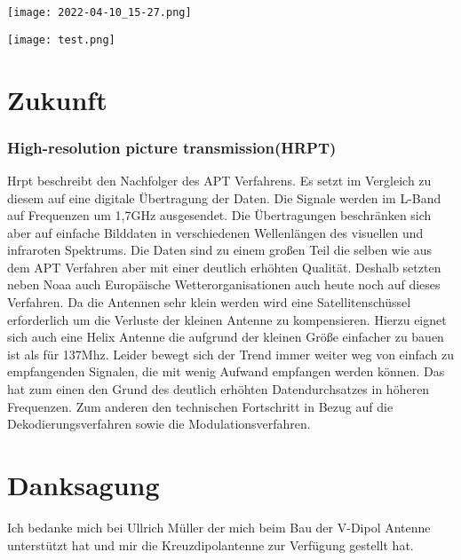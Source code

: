 \begin{center}
    \centering
    \texttt{[image: 2022-04-10\_15-27.png]}
\end{center}

\begin{center}
    \centering
    \texttt{[image: test.png]}
\end{center}



\part{Zukunft}
\section[]{High-resolution picture transmission(HRPT)}

Hrpt beschreibt den Nachfolger des APT Verfahrens. Es setzt im Vergleich zu diesem auf eine digitale Übertragung der Daten. Die Signale werden im L-Band auf Frequenzen um 1,7GHz ausgesendet. Die Übertragungen beschränken sich aber auf einfache Bilddaten in verschiedenen Wellenlängen des visuellen und infraroten Spektrums. Die Daten sind zu einem großen Teil die selben wie aus dem APT Verfahren aber mit einer deutlich erhöhten Qualität. Deshalb setzten neben Noaa auch Europäische Wetterorganisationen auch heute noch auf dieses Verfahren. Da die Antennen sehr klein werden wird eine Satellitenschüssel erforderlich um die Verluste der kleinen Antenne zu kompensieren. Hierzu eignet sich auch eine Helix Antenne die aufgrund der kleinen Größe einfacher zu bauen ist als für 137Mhz. Leider bewegt sich der Trend immer weiter weg von einfach zu empfangenden Signalen, die mit wenig Aufwand empfangen werden können. Das hat zum einen den Grund des deutlich erhöhten Datendurchsatzes in höheren Frequenzen. Zum anderen den technischen Fortschritt in Bezug auf die Dekodierungsverfahren sowie die Modulationsverfahren.  


\part*{Danksagung}

Ich bedanke mich bei Ullrich Müller der mich beim Bau der V-Dipol Antenne unterstützt hat und mir die Kreuzdipolantenne zur Verfügung gestellt hat.